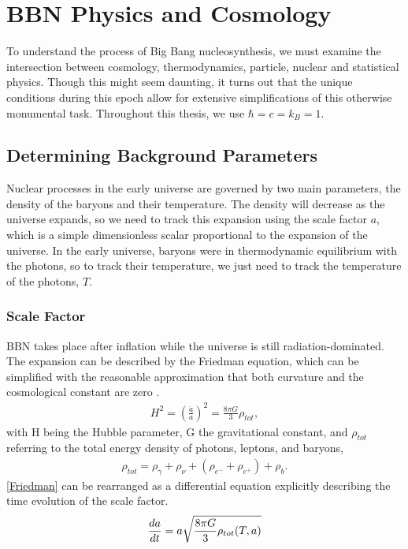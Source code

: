 
\chapter{BBN Physics and Cosmology}
\label{chap:theory}

To understand the process of Big Bang nucleosynthesis, we must examine the intersection between cosmology, thermodynamics, particle, nuclear and statistical physics. Though this might seem daunting, it turns out that the unique conditions during this epoch allow for extensive simplifications of this otherwise monumental task. Throughout this thesis, we use $\hbar=c=k_B=1$.



\section{Determining Background Parameters}
\label{sec:Background}
Nuclear processes in the early universe are governed by two main parameters, the density of the baryons and their temperature. The density will decrease as the universe expands, so we need to track this expansion using the scale factor $a$, which is a simple dimensionless scalar proportional to the expansion of the universe. In the early universe, baryons were in thermodynamic equilibrium with the photons, so to track their temperature, we just need to track the temperature of the photons, $T$. 


\subsection{Scale Factor}
\label{ssec:cosmology}

BBN takes place after inflation while the universe is still radiation-dominated. The expansion can be described by the Friedman equation, which can be simplified with the reasonable approximation that both curvature and the cosmological constant are zero \cite[{(4.29)}]{Ryden}. 
\begin{align}
    H^2=\left(\frac{\dot{a}}{a}\right)^2=\frac{8\pi G}{3}\rho_{tot},
    \label{Friedman}
\end{align}
with H being the Hubble parameter, G the gravitational constant, and $\rho_{tot}$ referring to the total energy density of photons, leptons, and baryons,
\begin{align}
    \rho_{tot}=\rho_{\gamma}+\rho_{\nu}+(\rho_{e^-}+\rho_{e^+})+\rho_{b}.
\end{align}
\eqref{Friedman} can be rearranged as a differential equation explicitly describing the time evolution of the scale factor.
\begin{align}
    \frac{da}{dt}=a\sqrt{\frac{8\pi G}{3}\rho_{tot}(T,a)}
    \label{eq:dadt}
\end{align}


